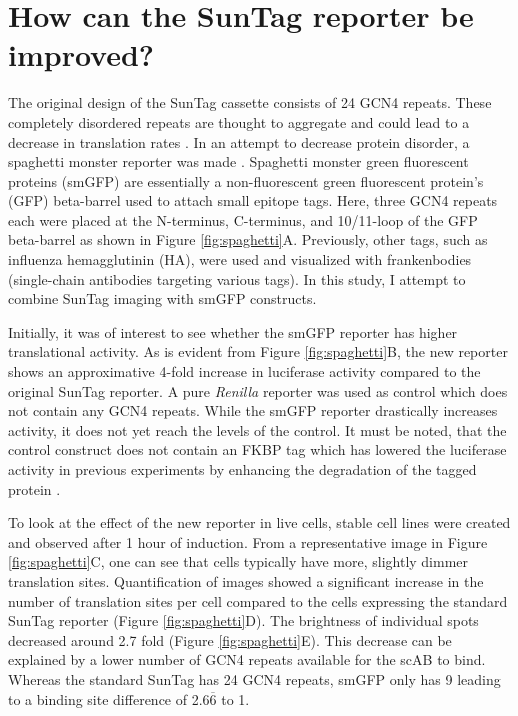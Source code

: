 \section{How can the SunTag reporter be improved?} \label{spaghetti}

The original design of the SunTag cassette consists of 24 GCN4 repeats.
These completely disordered repeats are thought to aggregate and could lead to a decrease in translation rates \cite{gurry_order_2015}.
In an attempt to decrease protein disorder, a spaghetti monster reporter was made \cite{zhao_genetically_2019}.
Spaghetti monster green fluorescent proteins (smGFP) are essentially a non-fluorescent green fluorescent protein's (GFP) beta-barrel used to attach small epitope tags.
Here, three GCN4 repeats each were placed at the N-terminus, C-terminus, and 10/11-loop of the GFP beta-barrel as shown in Figure \ref{fig:spaghetti}A.
Previously, other tags, such as influenza hemagglutinin (HA), were used and visualized with frankenbodies (single-chain antibodies targeting various tags).
In this study, I attempt to combine SunTag imaging with smGFP constructs.

Initially, it was of interest to see whether the smGFP reporter has higher translational activity.
As is evident from Figure \ref{fig:spaghetti}B, the new reporter shows an approximative 4-fold increase in luciferase activity compared to the original SunTag reporter.
A pure \textit{Renilla} reporter was used as control which does not contain any GCN4 repeats.
While the smGFP reporter drastically increases activity, it does not yet reach the levels of the control.
It must be noted, that the control construct does not contain an FKBP tag which has lowered the luciferase activity in previous experiments by enhancing the degradation of the tagged protein \cite{bonger_small_2011}.

To look at the effect of the new reporter in live cells, stable cell lines were created and observed after 1 hour of induction.
From a representative image in Figure \ref{fig:spaghetti}C, one can see that cells typically have more, slightly dimmer translation sites.
Quantification of images showed a significant increase in the number of translation sites per cell compared to the cells expressing the standard SunTag reporter (Figure \ref{fig:spaghetti}D).
The brightness of individual spots decreased around 2.7 fold (Figure \ref{fig:spaghetti}E).
This decrease can be explained by a lower number of GCN4 repeats available for the scAB to bind.
Whereas the standard SunTag has 24 GCN4 repeats, smGFP only has 9 leading to a binding site difference of 2.6$\overline{\mbox{6}}$ to 1.

